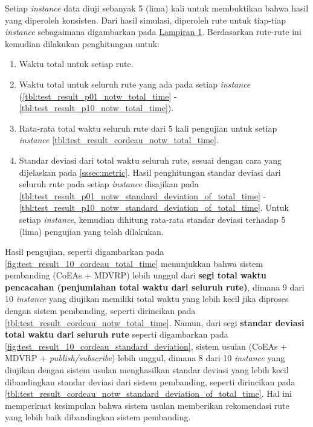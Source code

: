 Setiap \textit{instance} data diuji sebanyak 5 (lima) kali untuk membuktikan bahwa hasil yang diperoleh konsisten. Dari hasil simulasi, diperoleh rute untuk tiap-tiap \textit{instance} sebagaimana digambarkan pada \hyperref[ch:test_result_cordeau_notw]{Lampiran 1}. Berdasarkan rute-rute ini kemudian dilakukan penghitungan untuk:
\begin{enumerate}
	\item Waktu total untuk setiap rute.
	\item Waktu total untuk seluruh rute yang ada pada setiap \textit{instance} (\autoref{tbl:test_result_p01_notw_total_time} - \autoref{tbl:test_result_p10_notw_total_time}).
	\item Rata-rata total waktu seluruh rute dari 5 kali pengujian untuk setiap \textit{instance} \autoref{tbl:test_result_cordeau_notw_total_time}.
	\item Standar deviasi dari total waktu seluruh rute, sesuai dengan cara yang dijelaskan pada \autoref{sssec:metric}. Hasil penghitungan standar deviasi dari seluruh rute pada setiap \textit{instance} disajikan pada \autoref{tbl:test_result_p01_notw_standard_deviation_of_total_time} - \autoref{tbl:test_result_p10_notw_standard_deviation_of_total_time}. Untuk setiap \textit{instance}, kemudian dihitung rata-rata standar deviasi terhadap 5 (lima) pengujian yang telah dilakukan.
\end{enumerate}


Hasil pengujian, seperti digambarkan pada \autoref{fig:test_result_10_cordeau_total_time} menunjukkan bahwa sistem pembanding (CoEAs + MDVRP) lebih unggul dari \textbf{segi total waktu pencacahan (penjumlahan total waktu dari seluruh rute)}, dimana 9 dari 10 \textit{instance} yang diujikan memiliki total waktu yang lebih kecil jika diproses dengan sistem pembanding, seperti dirincikan pada \autoref{tbl:test_result_cordeau_notw_total_time}. Namun, dari segi \textbf{standar deviasi total waktu dari seluruh rute} seperti digambarkan pada \autoref{fig:test_result_10_cordeau_standard_deviation}, sistem usulan (CoEAs + MDVRP + \textit{publish/subscribe}) lebih unggul, dimana 8 dari 10 \textit{instance} yang diujikan dengan sistem usulan menghasilkan standar deviasi yang lebih kecil dibandingkan standar deviasi dari sistem pembanding, seperti dirincikan pada \autoref{tbl:test_result_cordeau_notw_standard_deviation_of_total_time}. Hal ini memperkuat kesimpulan bahwa sistem usulan memberikan rekomendasi rute yang lebih baik dibandingkan sistem pembanding. 


